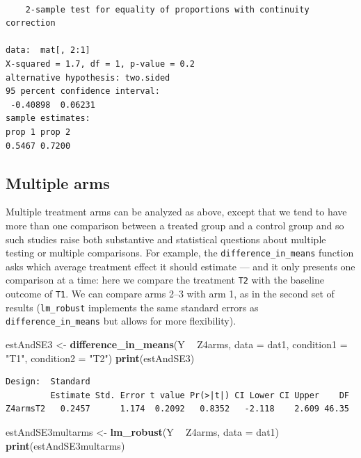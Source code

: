 \documentclass[
  12pt,
]{book}
\newenvironment{Shaded}{\begin{snugshade}}{\end{snugshade}}
\newcommand{\DataTypeTok}[1]{\textcolor[rgb]{0.13,0.29,0.53}{#1}}
\newcommand{\KeywordTok}[1]{\textcolor[rgb]{0.13,0.29,0.53}{\textbf{#1}}}
\newcommand{\NormalTok}[1]{#1}
\newcommand{\OperatorTok}[1]{\textcolor[rgb]{0.81,0.36,0.00}{\textbf{#1}}}
\newcommand{\StringTok}[1]{\textcolor[rgb]{0.31,0.60,0.02}{#1}}
\theoremstyle{definition}
\theoremstyle{definition}
\theoremstyle{definition}
\theoremstyle{remark}
\begin{document}
\begin{verbatim}

    2-sample test for equality of proportions with continuity correction

data:  mat[, 2:1]
X-squared = 1.7, df = 1, p-value = 0.2
alternative hypothesis: two.sided
95 percent confidence interval:
 -0.40898  0.06231
sample estimates:
prop 1 prop 2 
0.5467 0.7200 
\end{verbatim}

\hypertarget{multiple-arms}{%
\subsection{Multiple arms}\label{multiple-arms}}

Multiple treatment arms can be analyzed as above, except that we tend to
have more than one comparison between a treated group and a control
group and so such studies raise both substantive and statistical
questions about multiple testing or multiple comparisons. For example,
the \texttt{difference\_in\_means} function asks which average treatment
effect it should estimate --- and it only presents one comparison at a
time: here we compare the treatment \texttt{T2} with the baseline
outcome of \texttt{T1}. We can compare arms 2--3 with arm 1, as in the
second set of results (\texttt{lm\_robust} implements the same standard
errors as \texttt{difference\_in\_means} but allows for more
flexibility).

\begin{Shaded}
\begin{Highlighting}[]
\NormalTok{estAndSE3 <-}\StringTok{ }\KeywordTok{difference_in_means}\NormalTok{(Y }\OperatorTok{~}\StringTok{ }\NormalTok{Z4arms, }\DataTypeTok{data =}\NormalTok{ dat1, }\DataTypeTok{condition1 =} \StringTok{"T1"}\NormalTok{, }\DataTypeTok{condition2 =} \StringTok{"T2"}\NormalTok{)}
\KeywordTok{print}\NormalTok{(estAndSE3)}
\end{Highlighting}
\end{Shaded}

\begin{verbatim}
Design:  Standard 
         Estimate Std. Error t value Pr(>|t|) CI Lower CI Upper    DF
Z4armsT2   0.2457      1.174  0.2092   0.8352   -2.118    2.609 46.35
\end{verbatim}

\begin{Shaded}
\begin{Highlighting}[]
\NormalTok{estAndSE3multarms <-}\StringTok{ }\KeywordTok{lm_robust}\NormalTok{(Y }\OperatorTok{~}\StringTok{ }\NormalTok{Z4arms, }\DataTypeTok{data =}\NormalTok{ dat1)}
\KeywordTok{print}\NormalTok{(estAndSE3multarms)}
\end{Highlighting}
\end{Shaded}
\end{document}
